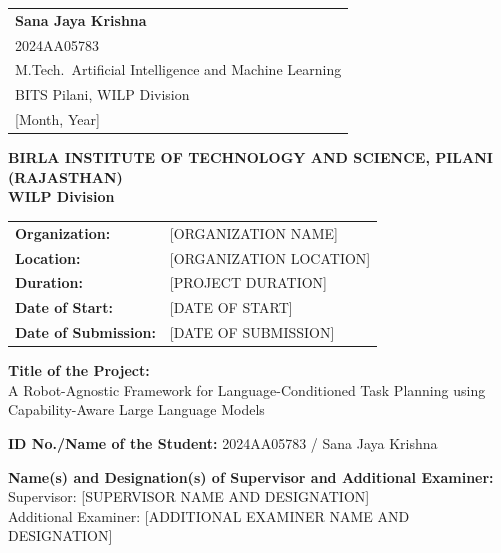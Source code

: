 \documentclass[12pt,a4paper]{article}
\begin{document}
\vspace{1.8cm}
\noindent
\begin{tabular}{@{}l@{}}
\textbf{Sana Jaya Krishna}\\
2024AA05783\\
M.Tech.\ Artificial Intelligence and Machine Learning\\
BITS Pilani, WILP Division\\
{[Month, Year]}
\end{tabular}

\newpage
\begin{center}
{\large\bfseries BIRLA INSTITUTE OF TECHNOLOGY AND SCIENCE, PILANI (RAJASTHAN)}\\[0.3cm]
{\large\bfseries WILP Division}
\end{center}

\vspace{0.4cm}
\begin{singlespace}
\noindent
\begin{tabular}{@{}ll@{}}
\textbf{Organization:}         & {[ORGANIZATION NAME]}          \\[4pt]
\textbf{Location:}             & {[ORGANIZATION LOCATION]}      \\[4pt]
\textbf{Duration:}             & {[PROJECT DURATION]}           \\[4pt]
\textbf{Date of Start:}        & {[DATE OF START]}              \\[4pt]
\textbf{Date of Submission:}   & {[DATE OF SUBMISSION]}         \\
\end{tabular}
\end{singlespace}

\vspace{0.5cm}
\noindent\textbf{Title of the Project:}\\
A Robot-Agnostic Framework for Language-Conditioned Task Planning using Capability-Aware Large Language Models

\vspace{0.4cm}
\noindent\textbf{ID No./Name of the Student:} 2024AA05783 / Sana Jaya Krishna

\vspace{0.4cm}
\noindent\textbf{Name(s) and Designation(s) of Supervisor and Additional Examiner:}\\
Supervisor: [SUPERVISOR NAME AND DESIGNATION]\\
Additional Examiner: [ADDITIONAL EXAMINER NAME AND DESIGNATION]
\end{document}
